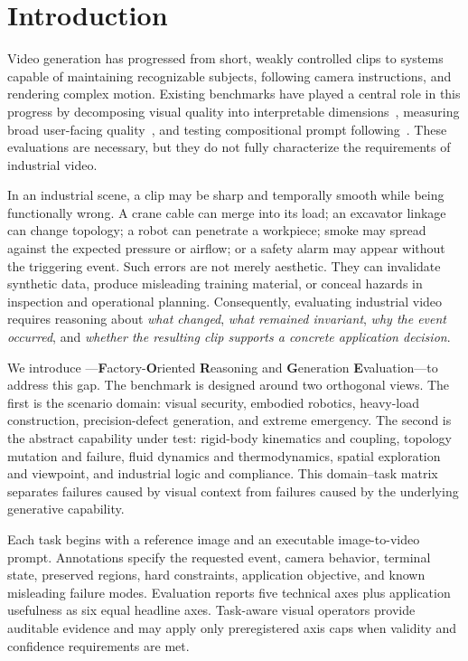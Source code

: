 \section{Introduction}
\label{sec:intro}

Video generation has progressed from short, weakly controlled clips to systems capable of maintaining recognizable subjects, following camera instructions, and rendering complex motion. Existing benchmarks have played a central role in this progress by decomposing visual quality into interpretable dimensions~\cite{huang2024vbench,huang2025vbenchpp}, measuring broad user-facing quality~\cite{liu2023evalcrafter}, and testing compositional prompt following~\cite{sun2024t2vcompbench}. These evaluations are necessary, but they do not fully characterize the requirements of industrial video.

In an industrial scene, a clip may be sharp and temporally smooth while being functionally wrong. A crane cable can merge into its load; an excavator linkage can change topology; a robot can penetrate a workpiece; smoke may spread against the expected pressure or airflow; or a safety alarm may appear without the triggering event. Such errors are not merely aesthetic. They can invalidate synthetic data, produce misleading training material, or conceal hazards in inspection and operational planning. Consequently, evaluating industrial video requires reasoning about \emph{what changed}, \emph{what remained invariant}, \emph{why the event occurred}, and \emph{whether the resulting clip supports a concrete application decision}.

We introduce \FORGE---\textbf{F}actory-\textbf{O}riented \textbf{R}easoning and \textbf{G}eneration \textbf{E}valuation---to address this gap. The benchmark is designed around two orthogonal views. The first is the scenario domain: visual security, embodied robotics, heavy-load construction, precision-defect generation, and extreme emergency. The second is the abstract capability under test: rigid-body kinematics and coupling, topology mutation and failure, fluid dynamics and thermodynamics, spatial exploration and viewpoint, and industrial logic and compliance. This domain--task matrix separates failures caused by visual context from failures caused by the underlying generative capability.

Each task begins with a reference image and an executable image-to-video prompt. Annotations specify the requested event, camera behavior, terminal state, preserved regions, hard constraints, application objective, and known misleading failure modes. Evaluation reports five technical axes plus application usefulness as six equal headline axes. Task-aware visual operators provide auditable evidence and may apply only preregistered axis caps when validity and confidence requirements are met.

